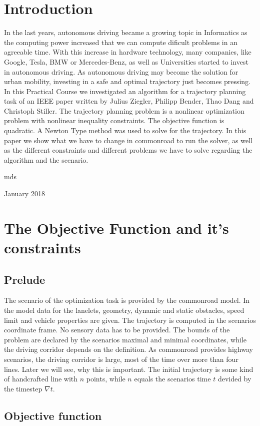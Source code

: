 \documentclass[conference]{IEEEtran}
\begin{document}
\section{Introduction}
In the last years, autonomous driving became a growing  topic in Informatics as the computing power increased that we can compute dificult problems in an agreeable time.
With this increase in hardware technology, many companies, like Google, Tesla, BMW or Mercedes-Benz, as well as Universities started to invest in autonomous driving. As autonomous driving may become the solution for urban mobility, investing in a safe and optimal trajectory just becomes pressing. In this Practical Course we investigated an algorithm for a trajectory planning task of an IEEE paper written by Julius Ziegler, Philipp Bender, Thao Dang and Christoph Stiller. The trajectory planning problem is a nonlinear optimization problem with nonlinear inequality constraints. The objective function is quadratic. A Newton Type method was used to solve for the trajectory. In this paper we show what we have to change in commonroad to run the solver, as well as the different constraints and different problems we have to solve regarding the algorithm and the scenario. 

\hfill mds
 
\hfill January 2018

\section{The Objective Function and it's constraints}
\subsection{Prelude}
The scenario of the optimization task is provided by the commonroad model. In the model data for the lanelets, geometry, dynamic and static obstacles, speed limit and vehicle properties are given. The trajectory is computed in the scenarios coordinate frame. No sensory data has to be provided. The bounds of the problem are declared by the scenarios maximal and minimal coordinates, while the driving corridor depends on the definition. As commonroad provides highway scenarios, the driving corridor is large, most of the time over more than four lines. Later we will see, why this is important. The initial trajectory is some kind of handcrafted line with $n$ points, while $n$ equals the scenarios time $t$ devided by the timestep $\nabla t$.

\subsection{Objective function}
\end{document}
